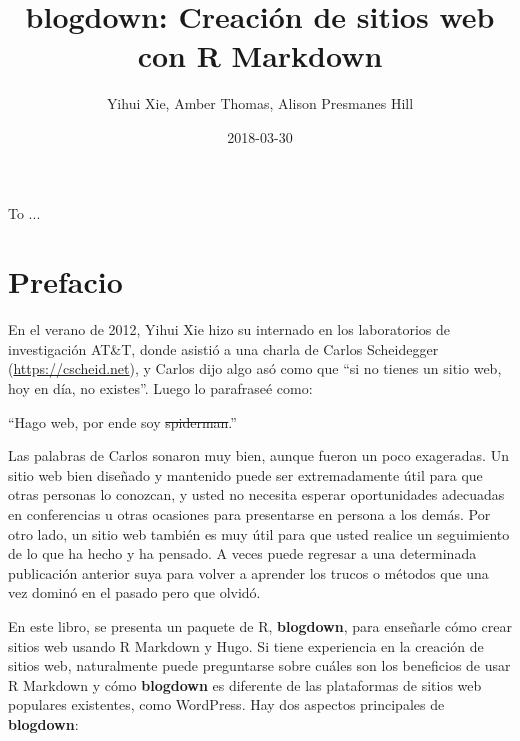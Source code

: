 \documentclass[12pt,]{krantz}
\title{blogdown: Creación de sitios web con R Markdown}
\author{Yihui Xie, Amber Thomas, Alison Presmanes Hill}
\date{2018-03-30}
\renewenvironment{quote}{\begin{VF}}{\end{VF}}
\theoremstyle{definition}
\theoremstyle{definition}
\theoremstyle{definition}
\theoremstyle{remark}
\begin{document}
\maketitle

\cleardoublepage\newpage\thispagestyle{empty}\null
\cleardoublepage\newpage\thispagestyle{empty}
\begin{center}
To ...
\end{center}

\setlength{\abovedisplayskip}{-5pt}
\frontmatter

{
\hypersetup{linkcolor=}
\setcounter{tocdepth}{2}
\tableofcontents
}
\listoftables
\listoffigures
\hypertarget{prefacio}{%
\chapter*{Prefacio}\label{prefacio}}


En el verano de 2012, Yihui Xie hizo su internado en los laboratorios de
investigación AT\&T, donde asistió a una charla de Carlos Scheidegger
(\url{https://cscheid.net}), y Carlos dijo algo asó como que ``si no
tienes un sitio web, hoy en día, no existes''. Luego lo parafraseé como:

\begin{quote}
``Hago web, por ende soy \sout{spiderman}.''
\end{quote}

Las palabras de Carlos sonaron muy bien, aunque fueron un poco
exageradas. Un sitio web bien diseñado y mantenido puede ser
extremadamente útil para que otras personas lo conozcan, y usted no
necesita esperar oportunidades adecuadas en conferencias u otras
ocasiones para presentarse en persona a los demás. Por otro lado, un
sitio web también es muy útil para que usted realice un seguimiento de
lo que ha hecho y ha pensado. A veces puede regresar a una determinada
publicación anterior suya para volver a aprender los trucos o métodos
que una vez dominó en el pasado pero que olvidó.

En este libro, se presenta un paquete de R, \textbf{blogdown}, para
enseñarle cómo crear sitios web usando R Markdown y Hugo. Si tiene
experiencia en la creación de sitios web, naturalmente puede preguntarse
sobre cuáles son los beneficios de usar R Markdown y cómo
\textbf{blogdown} es diferente de las plataformas de sitios web
populares existentes, como WordPress. Hay dos aspectos principales de
\textbf{blogdown}:
\end{document}
